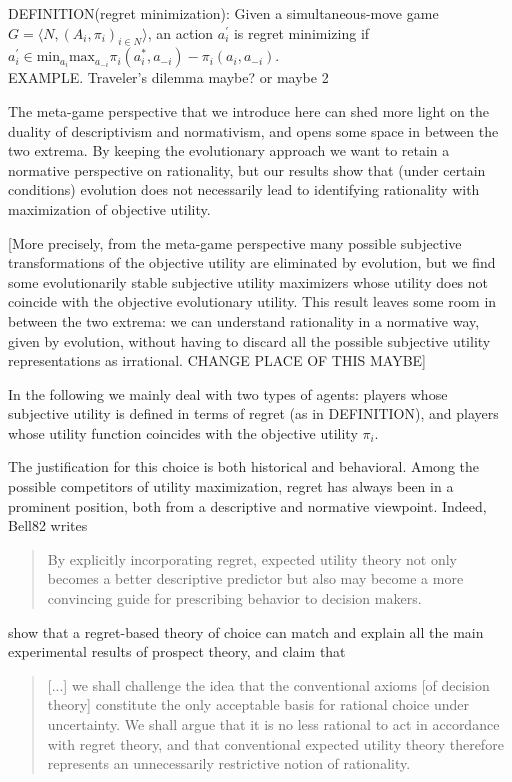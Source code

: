 \documentclass[fleqn,reqno,11pt]{article}
\begin{document}
DEFINITION(regret minimization): Given a simultaneous-move game $ G=\langle N, (A_i , \pi_i)_{i \in N} \rangle $, an action $a^{'}_i $ is regret minimizing if $a^{'}_i \in \text{min}_{a_i} \text{max}_{a_{-i}} \pi_i(a_i^*,a_{-i})-\pi_i(a_i,a_{-i}) $.\\

EXAMPLE. Traveler's dilemma maybe? or maybe 2



The meta-game perspective that we introduce here can shed more light on the duality of descriptivism and normativism, and opens
some space in between the two extrema. 
By keeping the evolutionary approach we want to retain a
normative perspective on rationality, but our results show that (under certain conditions)
evolution does not necessarily lead to identifying rationality with maximization of objective
utility.

[More precisely, from the meta-game perspective many possible subjective
transformations of the objective utility are eliminated by evolution, but we find some
evolutionarily stable subjective utility maximizers whose utility does not coincide with the
objective evolutionary utility. This result leaves some room in between the two extrema: we can
understand rationality in a normative way, given by evolution, without having to discard all
the possible subjective utility representations as irrational. CHANGE PLACE OF THIS MAYBE]


In the following we mainly deal with two types of agents: players whose subjective utility is defined
in terms of regret (as in DEFINITION), and players whose utility
function coincides with the objective utility $\pi_i$. 


The justification for this choice is both historical and behavioral. Among
the possible competitors of utility maximization, regret has always been in a prominent
position, both from a descriptive and normative viewpoint. Indeed, Bell82 writes
\begin{quote}
  By explicitly incorporating regret, expected utility theory not only becomes a better
  descriptive predictor but also may become a more convincing guide for prescribing behavior to
  decision makers.
\end{quote}
\citet{LoomesSugden1982:Regret-Theory:-} show that a regret-based theory of choice can match
and explain all the main experimental results of prospect theory, and claim that
\begin{quote} [...] we shall challenge the idea that the conventional axioms [of decision
  theory] constitute the only acceptable basis for rational choice under uncertainty. We shall
  argue that it is no less rational to act in accordance with regret theory, and that
  conventional expected utility theory therefore represents an unnecessarily restrictive notion
  of rationality. \hfill \citep{LoomesSugden1982:Regret-Theory:-}
\end{quote}
\end{document}

